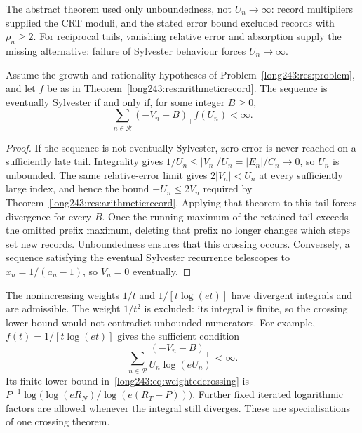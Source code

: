 \documentclass[11pt]{article}
\begin{document}
The abstract theorem used only unboundedness, not $U_n\to\infty$:
record multipliers supplied the CRT moduli, and the stated error bound
excluded records with $\rho_n\ge2$. For reciprocal tails, vanishing
relative error and absorption supply the missing alternative: failure
of Sylvester behaviour forces $U_n\to\infty$.

\begin{theorem}\label{long243:res:weightedrecord}
Assume the growth and rationality hypotheses of Problem~\ref{long243:res:problem},
and let $f$ be as in Theorem~\ref{long243:res:arithmeticrecord}. The sequence is
eventually Sylvester if and only if, for some integer $B\ge0$,
\[
 \sum_{n\in\mathcal R}(-V_n-B)_+f(U_n)<\infty.
\]
\end{theorem}

\begin{proof}
If the sequence is not eventually Sylvester, zero error is never reached on a sufficiently late
tail. Integrality gives $1/U_n\le|V_n|/U_n=|E_n|/C_n\to0$, so $U_n$ is
unbounded. The same relative-error limit gives $2|V_n|<U_n$ at every
sufficiently large index, and hence the bound $-U_n\le2V_n$ required
by Theorem~\ref{long243:res:arithmeticrecord}. Applying that theorem to
this tail forces divergence for every $B$. Once the running maximum of
the retained tail exceeds the omitted prefix maximum, deleting that
prefix no longer changes which steps set new records. Unboundedness
ensures that this crossing occurs. Conversely, a sequence satisfying
the eventual Sylvester recurrence
telescopes to $x_n=1/(a_n-1)$, so $V_n=0$ eventually.
\end{proof}

The nonincreasing weights $1/t$ and $1/[t\log(et)]$ have divergent
integrals and are admissible. The weight $1/t^2$ is excluded: its
integral is finite, so the crossing lower bound would not contradict
unbounded numerators. For example, $f(t)=1/[t\log(et)]$ gives
the sufficient condition
\[
 \sum_{n\in\mathcal R}\frac{(-V_n-B)_+}{U_n\log(eU_n)}<\infty.
\]
Its finite lower bound in~\eqref{long243:eq:weightedcrossing} is
$P^{-1}\log\bigl(\log(eR_N)/\log(e(R_T+P))\bigr)$.
Further fixed iterated logarithmic factors are allowed whenever the integral
still diverges. These are specialisations of one crossing theorem.
\end{document}
